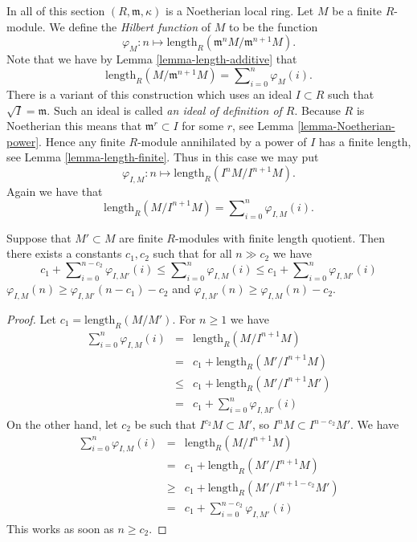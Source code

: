 \noindent
In all of this section $(R, \mathfrak m, \kappa)$
is a Noetherian local ring.
Let $M$ be a finite $R$-module. We define the {\it Hilbert
function} of $M$ to be the function
$$
\varphi_M : n
\longmapsto
\text{length}_R(\mathfrak m^nM/{\mathfrak m}^{n + 1}M).
$$
Note that we have by Lemma \ref{lemma-length-additive}
that
$$
\text{length}_R(M / \mathfrak m^{n + 1}M)
=
\sum\nolimits_{i = 0}^n
\varphi_M(i).
$$
There is a variant of this construction which uses an
ideal $I \subset R$ such that $\sqrt{I} = \mathfrak m$.
Such an ideal is called {\it an ideal of definition
of $R$}. Because $R$ is Noetherian this means that
$\mathfrak m^r \subset I$ for some $r$, see Lemma
\ref{lemma-Noetherian-power}. Hence any finite $R$-module
annihilated by a power of $I$ has a finite length, see Lemma
\ref{lemma-length-finite}.
Thus in this case we may put
$$
\varphi_{I, M} : n
\longmapsto
\text{length}_R(I^nM/I^{n + 1}M).
$$
Again we have that
$$
\text{length}_R(M / I^{n + 1}M)
=
\sum\nolimits_{i = 0}^n
\varphi_{I, M}(i).
$$

\begin{lemma}
\label{lemma-differ-finite}
Suppose that $M' \subset M$ are finite $R$-modules
with finite length quotient. Then there exists a
constants $c_1, c_2$ such that for all $n \gg c_2$ we have
$$
c_1 + \sum\nolimits_{i = 0}^{n - c_2} \varphi_{I, M'}(i)
\leq
\sum\nolimits_{i = 0}^n \varphi_{I, M}(i)
\leq
c_1 + \sum\nolimits_{i = 0}^n \varphi_{I, M'}(i)
$$
$\varphi_{I, M}(n) \geq \varphi_{I, M'}(n-c_1) - c_2$
and $\varphi_{I, M'}(n) \geq \varphi_{I, M}(n) - c_2$.
\end{lemma}

\begin{proof}
Let $c_1 = \text{length}_R(M/M')$. For $n \geq 1$ we have
\begin{eqnarray*}
\sum\nolimits_{i = 0}^n \varphi_{I, M}(i)
& = &
\text{length}_R(M/I^{n + 1}M) \\
& = &
c_1 + \text{length}_R(M'/I^{n + 1}M) \\
& \leq &
c_1 + \text{length}_R(M'/I^{n + 1}M') \\
& = &
c_1 + \sum\nolimits_{i = 0}^n \varphi_{I, M'}(i)
\end{eqnarray*}
On the other hand, let $c_2$ be such that $I^{c_2}M \subset M'$,
so $I^nM \subset I^{n - c_2}M'$. We have
\begin{eqnarray*}
\sum\nolimits_{i = 0}^n \varphi_{I, M}(i)
& = &
\text{length}_R(M/I^{n + 1}M) \\
& = &
c_1 + \text{length}_R(M'/I^{n + 1}M) \\
& \geq &
c_1 + \text{length}_R(M'/I^{n + 1 - c_2}M') \\
& = &
c_1 + \sum\nolimits_{i = 0}^{n - c_2} \varphi_{I, M'}(i)
\end{eqnarray*}
This works as soon as $n \geq c_2$.
\end{proof}

